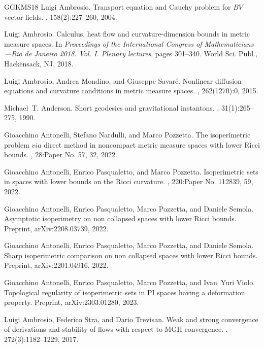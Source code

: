 \documentclass[11pt]{article}
\numberwithin{equation}{section}
\begin{document}
{\begin{thebibliography}{GGKMS18}
Luigi Ambrosio.
\newblock Transport equation and {C}auchy problem for {$BV$} vector fields.
, 158(2):227--260, 2004.

Luigi Ambrosio.
\newblock Calculus, heat flow and curvature-dimension bounds in metric measure
  spaces.
\newblock In {\em Proceedings of the {I}nternational {C}ongress of
  {M}athematicians---{R}io de {J}aneiro 2018. {V}ol. {I}. {P}lenary lectures},
  pages 301--340. World Sci. Publ., Hackensack, NJ, 2018.

Luigi Ambrosio, Andrea Mondino, and Giuseppe Savar{\'e}.
\newblock Nonlinear diffusion equations and curvature conditions in metric
  measure spaces.
, 262(1270):0, 2015.

Michael~T. Anderson.
\newblock Short geodesics and gravitational instantons.
, 31(1):265--275, 1990.

Gioacchino Antonelli, Stefano Nardulli, and Marco Pozzetta.
\newblock The isoperimetric problem {$via$} direct method in noncompact metric
  measure spaces with lower {R}icci bounds.
, 28:Paper No. 57, 32, 2022.

Gioacchino Antonelli, Enrico Pasqualetto, and Marco Pozzetta.
\newblock Isoperimetric sets in spaces with lower bounds on the {R}icci
  curvature.
, 220:Paper No. 112839, 59, 2022.

Gioacchino Antonelli, Enrico Pasqualetto, Marco Pozzetta, and Daniele Semola.
\newblock Asymptotic isoperimetry on non collapsed spaces with lower {R}icci
  bounds.
\newblock Preprint, arXiv:2208.03739, 2022.

Gioacchino Antonelli, Enrico Pasqualetto, Marco Pozzetta, and Daniele Semola.
\newblock Sharp isoperimetric comparison on non collapsed spaces with lower
  {R}icci bounds.
\newblock Preprint, arXiv:2201.04916, 2022.

Gioacchino Antonelli, Enrico Pasqualetto, Marco Pozzetta, and Ivan~Yuri Violo.
\newblock Topological regularity of isoperimetric sets in {PI} spaces having a
  deformation property.
\newblock Preprint, arXiv:2303.01280, 2023.

Luigi Ambrosio, Federico Stra, and Dario Trevisan.
\newblock Weak and strong convergence of derivations and stability of flows
  with respect to {MGH} convergence.
, 272(3):1182--1229, 2017.


\end{thebibliography}}
\end{document}
